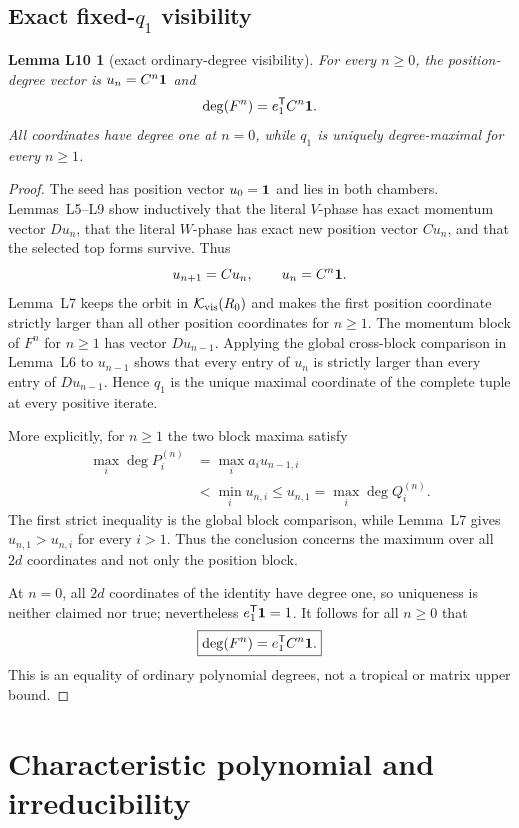\documentclass[11pt,letterpaper]{article}
\theoremstyle{plain}
\newtheorem*{lemLten}{Lemma L10}
\begin{document}
\subsection{Exact fixed-\texorpdfstring{$q_1$}{q1} visibility}

\begin{lemLten}[exact ordinary-degree visibility]
For every $n\geq0$, the position-degree vector is $u_n=C^n\mathbf{1}$ and
\[
\deg(F^n)=e_1^{\mathsf{T}}C^n\mathbf{1}.
\]
All coordinates have degree one at $n=0$, while $q_1$ is uniquely degree-maximal for every $n\geq1$.
\end{lemLten}

\begin{proof}
The seed has position vector $u_0=\mathbf{1}$ and lies in both chambers.  Lemmas~L5--L9 show inductively that the literal $V$-phase has exact momentum vector $Du_n$, that the literal $W$-phase has exact new position vector $Cu_n$, and that the selected top forms survive.  Thus
\[
u_{n+1}=Cu_n,\qquad u_n=C^n\mathbf{1}.
\]
Lemma~L7 keeps the orbit in $\mathcal{K}_{\mathrm{vis}}(R_0)$ and makes the first position coordinate strictly larger than all other position coordinates for $n\geq1$.  The momentum block of $F^n$ for $n\geq1$ has vector $Du_{n-1}$.  Applying the global cross-block comparison in Lemma~L6 to $u_{n-1}$ shows that every entry of $u_n$ is strictly larger than every entry of $Du_{n-1}$.  Hence $q_1$ is the unique maximal coordinate of the complete tuple at every positive iterate.

More explicitly, for $n\geq1$ the two block maxima satisfy
\[
\begin{aligned}
\max_i\deg P_i^{(n)}
&=\max_i a_i u_{n-1,i}\\
&<\min_i u_{n,i}
\leq u_{n,1}
=\max_i\deg Q_i^{(n)}.
\end{aligned}
\]
The first strict inequality is the global block comparison, while Lemma~L7 gives $u_{n,1}>u_{n,i}$ for every $i>1$.  Thus the conclusion concerns the maximum over all $2d$ coordinates and not only the position block.

At $n=0$, all $2d$ coordinates of the identity have degree one, so uniqueness is neither claimed nor true; nevertheless $e_1^{\mathsf{T}}\mathbf{1}=1$.  It follows for all $n\geq0$ that
\[
\boxed{\deg(F^n)=e_1^{\mathsf{T}}C^n\mathbf{1}.}
\]
This is an equality of ordinary polynomial degrees, not a tropical or matrix upper bound.
\end{proof}

\section{Characteristic polynomial and irreducibility}
\label{sec:arithmetic}
\end{document}
